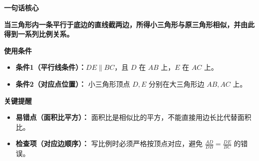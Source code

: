 \begin{summarybox}

	\textbf{\textcolor{CSummary}{一句话核心}}

	\textbf{当三角形内一条平行于底边的直线截两边，所得小三角形与原三角形相似，并由此得到一系列比例关系。}

	\medskip
	\textbf{\textcolor{CSummary}{使用条件}}
	\begin{itemize}[leftmargin=*, itemsep=0.5em, topsep=0.4em]
		\item \textbf{条件1（平行线条件）：}$DE\parallel BC$，且 $D$ 在 $AB$ 上，$E$ 在 $AC$ 上。
		\item \textbf{条件2（对应点位置）：} 小三角形顶点 $D,E$ 分别在大三角形边 $AB,AC$ 上。
	\end{itemize}

	\medskip
	\textbf{\textcolor{CSummary}{关键提醒}}
	\begin{itemize}[leftmargin=*, itemsep=0.5em, topsep=0.4em]
		\item \textbf{易错点（面积比平方）：} 面积比是相似比的平方，不能直接用边长比代替面积比。
		\item \textbf{检查项（对应边顺序）：} 写比例时必须严格按顶点对应，避免 $\frac{AD}{DB}=\frac{DE}{BC}$ 的错误。
	\end{itemize}
\end{summarybox}
